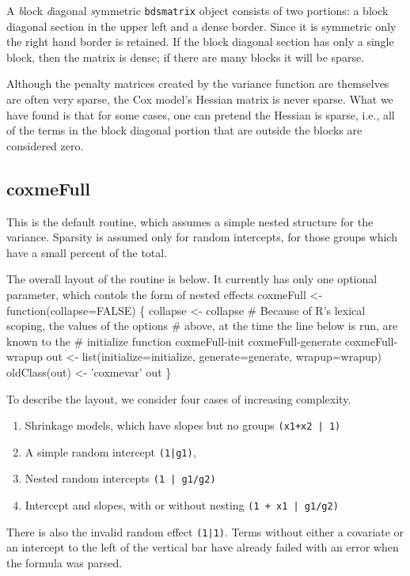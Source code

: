\documentclass{article}
\begin{document}
A \emph{b}lock \emph{d}iagonal \emph{s}ymmetric {\tt{}bdsmatrix} object 
consists of two portions: a block diagonal section in the upper left and
a dense border.  Since it is symmetric only the right hand border is
retained.
If the block diagonal section has only a single block, then the matrix
is dense; if there are many blocks it will be sparse.

Although the penalty matrices created by the variance function are
themselves are often very sparse, the Cox model's    %
Hessian matrix is never sparse.  What we have found is that for some
cases, one can pretend the Hessian is sparse, i.e.,
all of the terms in the block diagonal portion that are outside the
blocks are considered zero.  

\subsection{coxmeFull}
This is the default routine, which assumes a simple nested structure
for the variance.
Sparsity is assumed only for random intercepts, for those groups which
have a small percent of the total.

The overall layout of the routine is below.  It currently has only one
optional parameter, which contols the form of nested effects
\nwenddocs{}\endmoddef
coxmeFull <- function(collapse=FALSE) \{
    collapse <- collapse
    # Because of R's lexical scoping, the values of the options
    #  above, at the time the line below is run, are known to the
    #  initialize function
    \LA{}coxmeFull-init\RA{}
    \LA{}coxmeFull-generate\RA{}
    \LA{}coxmeFull-wrapup\RA{}
    out <- list(initialize=initialize, generate=generate, wrapup=wrapup)
    oldClass(out) <- 'coxmevar'
    out
    \}
\nwendcode{}\nwdocspar

To describe the layout, we consider four cases of increasing complexity.
\begin{enumerate}
  \item Shrinkage models, which have slopes but no groups {\tt{}(x1+x2\ |\ 1)}
  \item A simple random intercept {\tt{}(1|g1)}, 
  \item Nested random intercepts {\tt{}(1\ |\ g1/g2)}
  \item Intercept and slopes, with or without nesting {\tt{}(1\ +\ x1\ |\ g1/g2)}
\end{enumerate}
There is also the invalid random effect {\tt{}(1|1)}. 
Terms without either
a covariate or an intercept to the left of the vertical bar have already
failed with an error when the formula was parsed.
\end{document}
